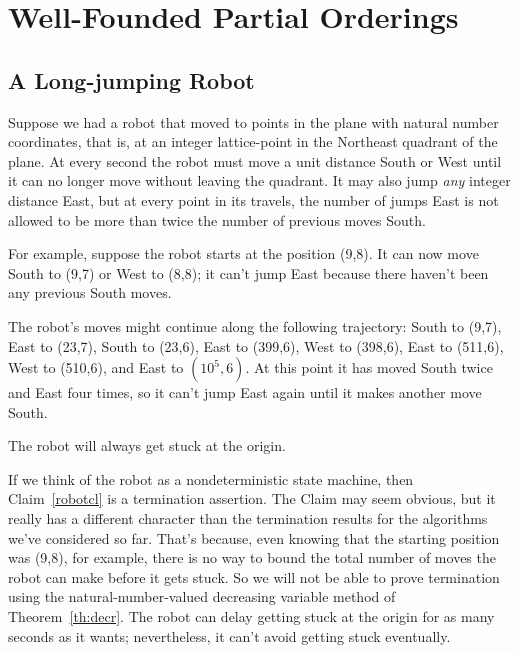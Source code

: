 
\def\vl{\text{value}}


\chapter{Well-Founded Partial Orderings}

\section{A Long-jumping Robot}

\iffalse Begin by defining the trivial ``pick how long'' game: P1 picks $n
\in \naturals$, the P2 and P1 alternate making forced moves.  The game
ends after $n$ forced moves; the last person to move wins.  So P1 strategy
is ``pick and even number.''  Insert here the discussion of ``terminates,
but no bound on number of steps...'' used below.

May also tell the ``guess a bigger number game''joke.
\fi

Suppose we had a robot that moved to points in the plane with natural
number coordinates, that is, at an integer lattice-point in the Northeast
quadrant of the plane.  At every second the robot must move a unit
distance South or West until it can no longer move without leaving the
quadrant.  It may also jump \emph{any} integer distance East, but at every
point in its travels, the number of jumps East is not allowed to be more
than twice the number of previous moves South.

For example, suppose the robot starts at the position (9,8).  It can now
move South to (9,7) or West to (8,8); it can't jump East because there
haven't been any previous South moves.

The robot's moves might continue along the following trajectory: South to
(9,7), East to (23,7), South to (23,6), East to (399,6), West to (398,6),
East to (511,6), West to (510,6), and East to $(10^5,6)$.  At this point
it has moved South twice and East four times, so it can't jump East again
until it makes another move South.

\begin{claim}\label{robotcl}
The robot will always get stuck at the origin.
\end{claim}

If we think of the robot as a nondeterministic state machine, then
Claim~\ref{robotcl} is a termination assertion.  The Claim may seem
obvious, but it really has a different character than the termination
results for the algorithms we've considered so far.  That's because, even
knowing that the starting position was (9,8), for example, there is no
way to bound the total number of moves the robot can make before it gets
stuck.  So we will not be able to prove termination using the
natural-number-valued decreasing variable method of Theorem~\ref{th:decr}.
The robot can delay getting stuck at the origin for as many seconds as it
wants; nevertheless, it can't avoid getting stuck eventually.


